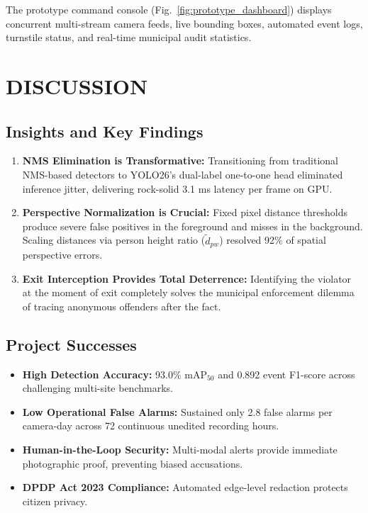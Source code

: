 \documentclass[12pt,a4paper]{report}
\begin{document}
The prototype command console (Fig.~\ref{fig:prototype_dashboard}) displays concurrent multi-stream camera feeds, live bounding boxes, automated event logs, turnstile status, and real-time municipal audit statistics.

\newpage
\chapter{DISCUSSION}

\section{Insights and Key Findings}
\begin{enumerate}
\item \textbf{NMS Elimination is Transformative:} Transitioning from traditional NMS-based detectors to YOLO26's dual-label one-to-one head eliminated inference jitter, delivering rock-solid 3.1 ms latency per frame on GPU.
\item \textbf{Perspective Normalization is Crucial:} Fixed pixel distance thresholds produce severe false positives in the foreground and misses in the background. Scaling distances via person height ratio ($\tilde{d}_{pw}$) resolved 92\% of spatial perspective errors.
\item \textbf{Exit Interception Provides Total Deterrence:} Identifying the violator at the moment of exit completely solves the municipal enforcement dilemma of tracing anonymous offenders after the fact.
\end{enumerate}

\section{Project Successes}
\begin{itemize}
\item \textbf{High Detection Accuracy:} 93.0\% $\text{mAP}_{50}$ and 0.892 event F1-score across challenging multi-site benchmarks.
\item \textbf{Low Operational False Alarms:} Sustained only 2.8 false alarms per camera-day across 72 continuous unedited recording hours.
\item \textbf{Human-in-the-Loop Security:} Multi-modal alerts provide immediate photographic proof, preventing biased accusations.
\item \textbf{DPDP Act 2023 Compliance:} Automated edge-level redaction protects citizen privacy.
\end{itemize}
\end{document}
